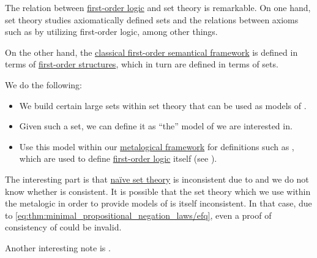 \begin{remark}\label{rem:set_definition_recursion}
  The relation between \hyperref[subsec:first_order_logic]{first-order logic} and set theory is remarkable. On one hand, set theory studies axiomatically defined sets and the relations between axioms such as \hyperref[def:zfc]{} by utilizing first-order logic, among other things.

  On the other hand, the \hyperref[def:first_order_semantics]{classical first-order semantical framework} is defined in terms of \hyperref[def:first_order_structure]{first-order structures}, which in turn are defined in terms of sets.

  We do the following:
  \begin{itemize}
    \item We build certain large sets within set theory that can be used as models of .
    \item Given such a set, we can define it as \enquote{the} model of  we are interested in.
    \item Use this model within our \hyperref[rem:metalogic]{metalogical framework} for definitions such as , which are used to define \hyperref[subsec:first_order_logic]{first-order logic} itself (see ).
  \end{itemize}

  The interesting part is that \hyperref[def:naive_set_theory]{na\"ive set theory} is inconsistent due to  and we do not know whether \hyperref[def:zfc]{} is consistent. It is possible that the set theory which we use within the metalogic in order to provide models of  is itself inconsistent. In that case, due to \eqref{eq:thm:minimal_propositional_negation_laws/efq}, even a proof of consistency of  could be invalid.

  Another interesting note is .
\end{remark}

